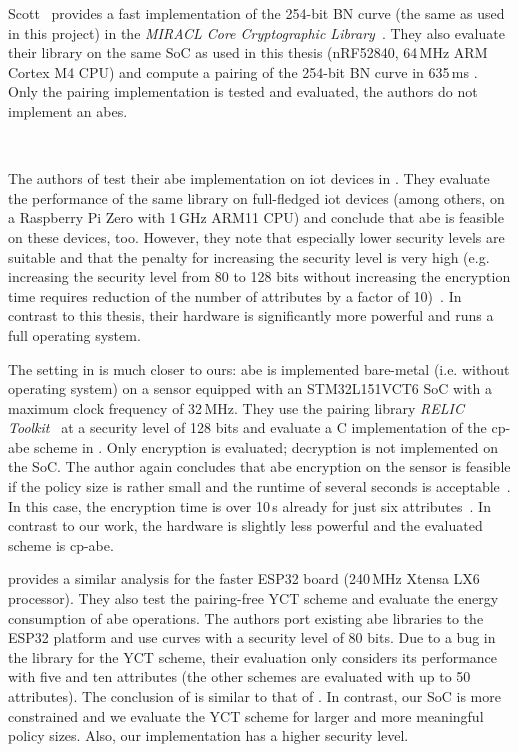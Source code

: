 Scott~\cite{scott_deployment_2020} provides a fast implementation of the 254-bit BN curve (the same as used in this project) in the \emph{MIRACL Core Cryptographic Library}~\cite{scott_miracl_nodate}.
They also evaluate their library on the same SoC as used in this thesis (nRF52840, 64\,MHz ARM Cortex M4 CPU) and compute a pairing of the 254-bit BN curve in 635\,ms \cite[Table~4]{scott_deployment_2020}.
Only the pairing implementation is tested and evaluated, the authors do not implement an \acrshort{abes}.

~

The authors of \cite{ambrosin_feasibility_2015} test their \acrshort{abe} implementation on \gls{iot} devices in \cite{ambrosin_feasibility_2016}.
They evaluate the performance of the same library on full-fledged \acrshort{iot} devices (among others, on a Raspberry Pi Zero with 1\,GHz ARM11 CPU) and conclude that \acrshort{abe} is feasible on these devices, too.
However, they note that especially lower security levels are suitable and that the penalty for increasing the security level is very high (e.g. increasing the security level from 80 to 128 bits without increasing the encryption time requires reduction of the number of attributes by a factor of 10)~\cite{ambrosin_feasibility_2016}.
In contrast to this thesis, their hardware is significantly more powerful and runs a full operating system.

The setting in \cite{borgh_attribute-based_2016} is much closer to ours: \acrshort{abe} is implemented bare-metal (i.e. without operating system) on a sensor equipped with an STM32L151VCT6 SoC with a maximum clock frequency of 32\,MHz.
They use the pairing library \emph{RELIC Toolkit}~\cite{aranha_relic_nodate} at a security level of 128 bits and evaluate a C implementation of the \acrshort{cp-abe} scheme in \cite{waters_ciphertext-policy_2011}.
Only encryption is evaluated; decryption is not implemented on the SoC.
The author again concludes that \acrshort{abe} encryption on the sensor is feasible if the policy size is rather small and the runtime of several seconds is acceptable~\cite{borgh_attribute-based_2016}.
In this case, the encryption time is over 10\,s already for just six attributes~\cite{borgh_attribute-based_2016}.
In contrast to our work, the hardware is slightly less powerful and the evaluated scheme is \acrshort{cp-abe}.

\cite{girgenti_feasibility_2019} provides a similar analysis for the faster ESP32 board (240\,MHz Xtensa LX6 processor).
They also test the pairing-free YCT scheme \cite{yao_lightweight_2015} and evaluate the energy consumption of \acrshort{abe} operations.
The authors port existing \acrshort{abe} libraries to the ESP32 platform and use curves with a security level of 80 bits.
Due to a bug in the library for the YCT scheme, their evaluation only considers its performance with five and ten attributes (the other schemes are evaluated with up to 50 attributes).
The conclusion of \cite{girgenti_feasibility_2019} is similar to that of \cite{borgh_attribute-based_2016}. 
In contrast, our SoC is more constrained and we evaluate the YCT scheme for larger and more meaningful policy sizes.
Also, our implementation has a higher security level.